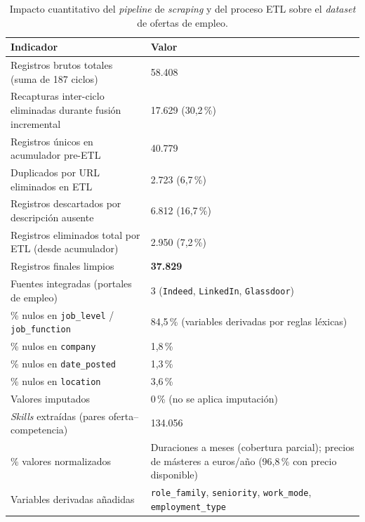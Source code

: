 \begin{table}[H]
  \caption{Impacto cuantitativo del \textit{pipeline} de \textit{scraping} y del proceso ETL sobre el \textit{dataset} de ofertas de empleo.}
  \label{tab:etl_impacto}
  \centering
  \footnotesize
  \begin{tabular}{|p{7.5cm}|p{5.5cm}|}
    \hline
    \rowcolor{gray!15}
    \textbf{Indicador} & \textbf{Valor} \\
    \hline
    Registros brutos totales (suma de 187 ciclos) & 58.408 \\
    \hline
    Recapturas inter-ciclo eliminadas durante fusión incremental & 17.629 (30,2\,\%) \\
    \hline
    Registros únicos en acumulador pre-ETL & 40.779 \\
    \hline
    Duplicados por URL eliminados en ETL & 2.723 (6,7\,\%) \\
    \hline
    Registros descartados por descripción ausente & 6.812 (16,7\,\%) \\
    \hline
    Registros eliminados total por ETL (desde acumulador) & 2.950 (7,2\,\%) \\
    \hline
    Registros finales limpios & \textbf{37.829} \\
    \hline
    Fuentes integradas (portales de empleo) & 3 (\texttt{Indeed}, \texttt{LinkedIn}, \texttt{Glassdoor}) \\
    \hline
    \% nulos en \texttt{job\_level} / \texttt{job\_function} & 84,5\,\% (variables derivadas por reglas léxicas) \\
    \hline
    \% nulos en \texttt{company} & 1,8\,\% \\
    \hline
    \% nulos en \texttt{date\_posted} & 1,3\,\% \\
    \hline
    \% nulos en \texttt{location} & 3,6\,\% \\
    \hline
    Valores imputados & 0\,\% (no se aplica imputación) \\
    \hline
    \textit{Skills} extraídas (pares oferta--competencia) & 134.056 \\
    \hline
    \% valores normalizados & Duraciones a meses (cobertura parcial); precios de másteres a euros/año (96,8\,\% con precio disponible) \\
    \hline
    Variables derivadas añadidas & \texttt{role\_family}, \texttt{seniority}, \texttt{work\_mode}, \texttt{employment\_type} \\
    \hline
  \end{tabular}
\end{table}

